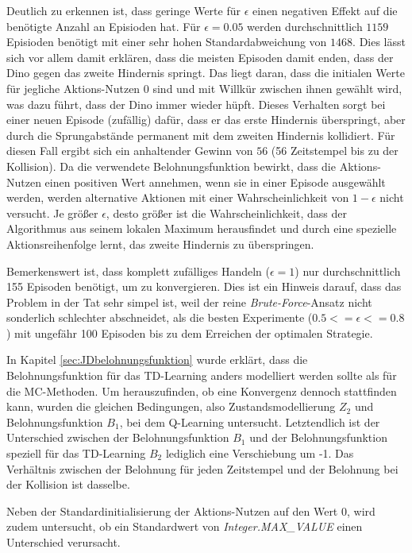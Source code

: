 Deutlich zu erkennen ist, dass geringe Werte für $\epsilon$ einen negativen Effekt auf die benötigte Anzahl an Episioden hat. Für $\epsilon = 0.05$ werden durchschnittlich $1159$ Episioden benötigt mit einer sehr hohen Standardabweichung von $1468$. Dies lässt sich vor allem damit erklären, dass die meisten Episoden damit enden, dass der Dino gegen das zweite Hindernis springt. Das liegt daran, dass die initialen Werte für jegliche Aktions-Nutzen 0 sind und mit Willkür zwischen ihnen gewählt wird, was dazu führt, dass der Dino immer wieder hüpft. Dieses Verhalten sorgt bei einer neuen Episode (zufällig) dafür, dass er das erste Hindernis überspringt, aber durch die Sprungabstände permanent mit dem zweiten Hindernis kollidiert. Für diesen Fall ergibt sich ein anhaltender Gewinn von $56$ (56 Zeitstempel bis zu der Kollision). Da die verwendete Belohnungsfunktion bewirkt, dass die Aktions-Nutzen einen positiven Wert annehmen, wenn sie in einer Episode ausgewählt werden, werden alternative Aktionen mit einer Wahrscheinlichkeit von $1-\epsilon$ nicht versucht. Je größer $\epsilon$, desto größer ist die Wahrscheinlichkeit, dass der Algorithmus aus seinem lokalen Maximum herausfindet und durch eine spezielle Aktionsreihenfolge lernt, das zweite Hindernis zu überspringen.
\par
Bemerkenswert ist, dass komplett zufälliges Handeln ($\epsilon = 1$) nur durchschnittlich 155 Episoden benötigt, um zu konvergieren. Dies ist ein Hinweis darauf, dass das Problem in der Tat sehr simpel ist, weil der reine \textit{Brute-Force}-Ansatz nicht sonderlich schlechter abschneidet, als die besten Experimente ($0.5 <= \epsilon <= 0.8$ ) mit ungefähr 100 Episoden bis zu dem Erreichen der optimalen Strategie.

\par 
In Kapitel \ref{sec:JDbelohnungsfunktion} wurde erklärt, dass die Belohnungsfunktion für das TD-Learning anders modelliert werden sollte als für die MC-Methoden. Um herauszufinden, ob eine Konvergenz dennoch stattfinden kann, wurden die gleichen Bedingungen, also Zustandsmodellierung $Z_2$ und Belohnungsfunktion $B_1$, bei dem Q-Learning untersucht. Letztendlich ist der Unterschied zwischen der Belohnungsfunktion $B_1$ und der Belohnungsfunktion speziell für das TD-Learning $B_2$ lediglich eine Verschiebung um -1. Das Verhältnis zwischen der Belohnung für jeden Zeitstempel und der Belohnung bei der Kollision ist dasselbe.
\par 
Neben der Standardinitialisierung der Aktions-Nutzen auf den Wert 0, wird zudem untersucht, ob ein Standardwert von \textit{Integer.MAX\_VALUE} einen Unterschied verursacht.

